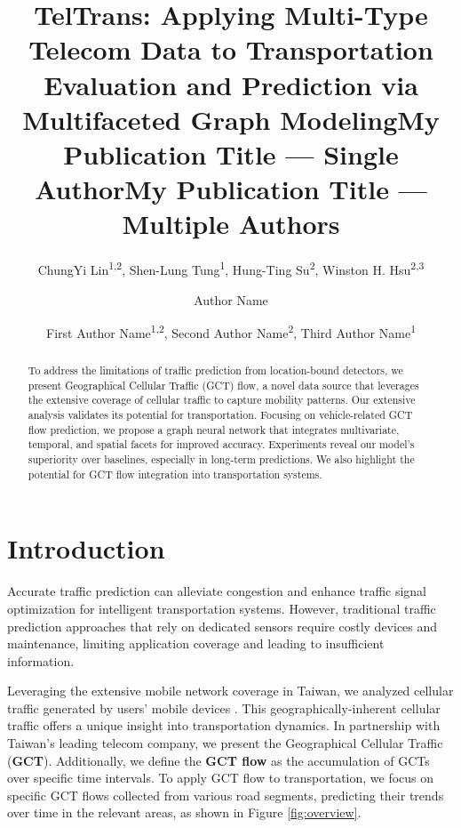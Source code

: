 \documentclass[letterpaper]{article} %
\title{TelTrans: Applying Multi-Type Telecom Data to Transportation Evaluation and Prediction via Multifaceted Graph Modeling}
\author{
    ChungYi Lin\textsuperscript{\rm 1,2}, Shen-Lung Tung\textsuperscript{\rm 1}, Hung-Ting Su\textsuperscript{\rm 2}, Winston H. Hsu\textsuperscript{\rm 2,3}
    \\
}
\title{My Publication Title --- Single Author}
\author {
    Author Name
}
\title{My Publication Title --- Multiple Authors}
\author {
    First Author Name\textsuperscript{\rm 1,\rm 2},
    Second Author Name\textsuperscript{\rm 2},
    Third Author Name\textsuperscript{\rm 1}
}
\begin{document}
\maketitle

\begin{abstract}
To address the limitations of traffic prediction from location-bound detectors, we present Geographical Cellular Traffic (GCT) flow, a novel data source that leverages the extensive coverage of cellular traffic to capture mobility patterns. Our extensive analysis validates its potential for transportation. Focusing on vehicle-related GCT flow prediction, we propose a graph neural network that integrates multivariate, temporal, and spatial facets for improved accuracy. Experiments reveal our model's superiority over baselines, especially in long-term predictions. We also highlight the potential for GCT flow integration into transportation systems.
\end{abstract}

\section{Introduction}
Accurate traffic prediction can alleviate congestion \cite{lv2021deep} and enhance traffic signal optimization \cite{xie2020urban} for intelligent transportation
systems. However, traditional traffic prediction approaches that rely on dedicated sensors require costly devices and maintenance, limiting application coverage and leading to insufficient information.

Leveraging the extensive mobile network coverage in Taiwan, we analyzed cellular traffic generated by users' mobile devices \cite{jiang2022cellular,zhao2021spatial}. This geographically-inherent cellular traffic offers a unique insight into transportation dynamics. In partnership with Taiwan's leading telecom company, we present the Geographical Cellular Traffic (\textbf{GCT}). Additionally, we define the \textbf{GCT flow} as the accumulation of GCTs over specific time intervals. To apply GCT flow to transportation, we focus on specific GCT flows collected from various road segments, predicting their trends over time in the relevant areas, as shown in Figure \ref{fig:overview}.
\end{document}
